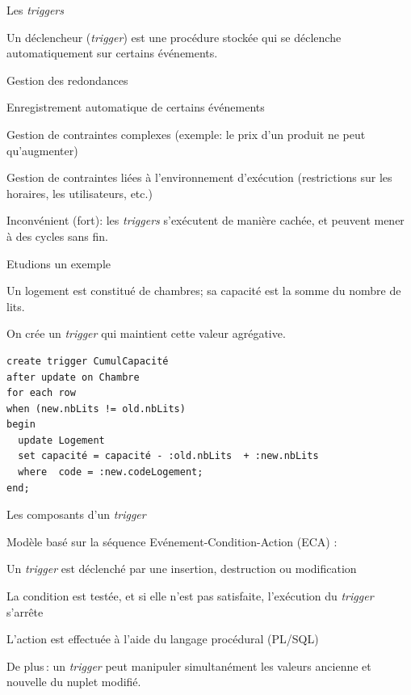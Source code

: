 


\begin{frame}[fragile]{Les \textit{triggers}}

Un \alert{déclencheur}  (\textit{trigger}) est  une procédure stockée qui se déclenche
 automatiquement sur certains événements.
 
 \vfill
 
\begin{redbullet}
 \item Gestion des redondances
   \item Enregistrement automatique de certains événements
  \item Gestion de contraintes complexes  (exemple: le prix d’un produit ne peut qu’augmenter)
   \item Gestion de contraintes liées à l’environnement d’exécution (restrictions sur les horaires, les utilisateurs, etc.)
\end{redbullet}
 
\vfill

\alert{Inconvénient (fort)}: les \textit{triggers} s'exécutent de manière cachée, et peuvent mener
à des cycles sans fin.
\end{frame}

\begin{frame}[fragile]{Etudions un exemple}

Un logement est constitué de chambres; sa
capacité est la somme du nombre de lits.

\vfill

On crée un \textit{trigger} qui maintient cette valeur agrégative.
 
\begin{small}
\begin{verbatim}
create trigger CumulCapacité
after update on Chambre
for each row
when (new.nbLits != old.nbLits)
begin
  update Logement 
  set capacité = capacité - :old.nbLits  + :new.nbLits   
  where  code = :new.codeLogement;
end;
\end{verbatim}
\end{small}

\end{frame}



\begin{frame}[fragile]{Les composants d'un \textit{trigger}}

Modèle basé sur la séquence Evénement-Condition-Action 
(ECA) :

\begin{redbullet}
  \item Un \textit{trigger} est déclenché par  une insertion, destruction ou modification 
   \item La condition est testée, et si elle n'est pas satisfaite, l'exécution du \textit{trigger} s'arrête
  \item L’action est effectuée  à l’aide du langage procédural  (PL/SQL)
\end{redbullet}

\vfill

\alert{De plus}\,: 
un \textit{trigger} peut manipuler 
simultanément les valeurs ancienne et nouvelle du nuplet modifié.
\end{frame}


